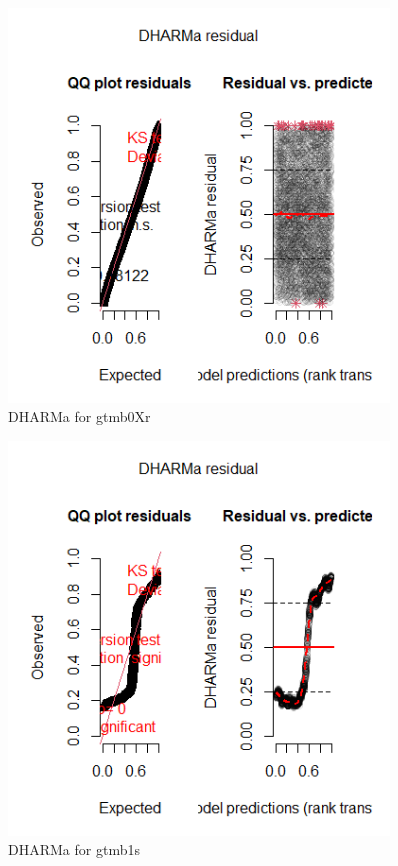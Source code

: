 \begin{figure}[h]
    \centering
    \includegraphics[width=0.9\textwidth]{visuals/DHARMagtmb0Xr.png}
    \caption{DHARMa for gtmb0Xr}
    \label{fig:modfitgtmb7}
\end{figure}

\begin{figure}[h]
    \centering
    \includegraphics[width=0.9\textwidth]{visuals/DHARMagtmb1s.png}
    \caption{DHARMa for gtmb1s}
    \label{fig:modfitgtmb7}
\end{figure}

